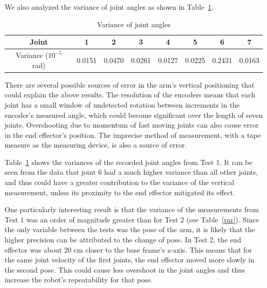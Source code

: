 \documentclass{../lab}
\begin{document}
\begin{task}
  We also analyzed the variance of joint angles as shown in Table~\ref{qvar}.
  \begin{table}[H]
  \centering
  \setlength\tabcolsep{0.1cm}
  \begin{tabular}{|c|ccccccc|}
    \hline
    Joint & 1 & 2 & 3 & 4 & 5 & 6 & 7 \\
   \hline
   Variance ($10^{-5}$ rad) & 0.0151 & 0.0470 & 0.0261 & 0.0127 & 0.0225 & 0.2431 & 0.0163 \\
   \hline
  \end{tabular}
  \label{qvar}
  \caption{Variance of joint angles}
  \end{table}

    There are several possible sources of error in the arm’s vertical positioning that could explain the above results. The resolution of the encoders means that each joint has a small window of undetected rotation between increments in the encoder’s measured angle, which could become significant over the length of seven joints. Overshooting due to momentum of fast moving joints can also cause error in the end effector’s position. The imprecise method of measurement, with a tape measure as the measuring device, is also a source of error.

    Table~\ref{qvar} shows the variances of the recorded joint angles from Test 1. It can be seen from the data that joint 6 had a much higher variance than all other joints, and thus could have a greater contribution to the variance of the vertical measurement, unless its proximity to the end effector mitigated its effect.

    One particularly interesting result is that the variance of the measurements from Test 1 was an order of magnitude greater than for Test 2 (see Table~\ref{var}). Since the only variable between the tests was the pose of the arm, it is likely that the higher precision can be attributed to the change of pose. In Test 2, the end effector was about 20 cm closer to the base frame’s z-axis. This means that for the same joint velocity of the first joints, the end effector moved more slowly in the second pose. This could cause less overshoot in the joint angles and thus increase the robot’s repeatability for that pose. 
  
\end{task}
\end{document}
